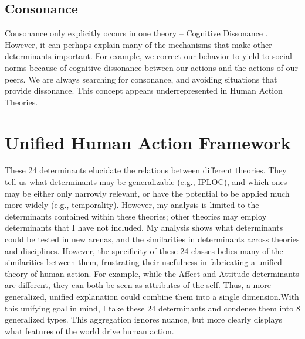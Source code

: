 \documentclass[12 pt]{article}
\begin{document}
		\subsection{Consonance}
		Consonance only explicitly occurs in one theory -- Cognitive Dissonance \parencite{Festinger1957}. However, it can perhaps explain many of the mechanisms that make other determinants important. For example, we correct our behavior to yield to social norms because of cognitive dissonance between our actions and the actions of our peers. We are always searching for consonance, and avoiding situations that provide dissonance. This concept appears underrepresented in Human Action Theories. 
	
 \section{Unified Human Action Framework}
 
 These 24 determinants elucidate the relations between different theories. They tell us what determinants may be generalizable (e.g., IPLOC), and which ones may be either only narrowly relevant, or have the potential to be applied much more widely (e.g., temporality). However, my analysis is limited to the determinants contained within these theories; other theories may employ determinants that I have not included. My analysis shows what determinants could be tested in new arenas, and the similarities in determinants across theories and disciplines.  However, the specificity of these 24 classes belies many of the similarities between them, frustrating their usefulness in fabricating a unified theory of human action.  For example, while the Affect and Attitude determinants are different, they can both be seen as attributes of the self. Thus, a more generalized, unified explanation could combine them into a single dimension.With this unifying goal in mind, I take these 24 determinants and condense them into 8 generalized types. This aggregation ignores nuance, but more clearly displays what features of the world drive human action. 
 
\end{document}
